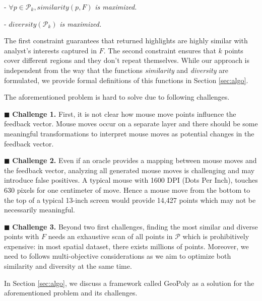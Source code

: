 \documentclass{vldb}
\begin{document}
\vspace{2pt}
\noindent - $\forall p \in \mathcal{P}_k, \mathit{similarity}(p,F)$ {\em is maximized.}

\vspace{2pt}
\noindent - $\mathit{diversity}(\mathcal{P}_k)$ {\em is maximized.}

\vspace{2pt}
The first constraint guarantees that returned highlights are highly similar with analyst's interests captured in $F$. The second constraint ensures that $k$ points cover different regions and they don't repeat themselves. While our approach is independent from the way that the functions {\em similarity} and {\em diversity} are formulated, we provide formal definitions of this functions in Section \ref{sec:algo}.

\vspace{2pt}
The aforementioned problem is hard to solve due to following challenges.

\vspace{2pt}
\noindent $\blacksquare$ {\bf Challenge 1.} First, it is not clear how mouse move points influence the feedback vector. Mouse moves occur on a separate layer and there should be some meaningful transformations to interpret mouse moves as potential changes in the feedback vector. 

\vspace{2pt}
\noindent $\blacksquare$ {\bf Challenge 2.} Even if an oracle provides a mapping between mouse moves and the feedback vector, analyzing all generated mouse moves is challenging and may introduce false positives. A typical mouse with 1600 DPI (Dots Per Inch), touches 630 pixels for one centimeter of move. Hence a mouse move from the bottom to the top of a typical 13-inch screen would provide 14,427 points which may not be necessarily meaningful.

\vspace{2pt}
\noindent $\blacksquare$ {\bf Challenge 3.} Beyond two first challenges, finding the most similar and diverse points with $F$ needs an exhaustive scan of all points in $\mathcal{P}$ which is prohibitively expensive: in most spatial dataset, there exists millions of points. Moreover, we need to follows multi-objective considerations as we aim to optimize both similarity and diversity at the same time.

\vspace{2pt}
In Section \ref{sec:algo}, we discuss a framework called {\sc GeoPoly} as a solution for the aforementioned problem and its challenges.
\end{document}

